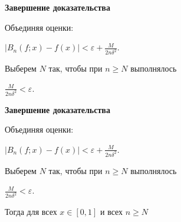 \documentclass[11pt]{article}
\begin{document}
\newpage

\begin{center}
{\color{notaeYELLOW}\bfseries\fontsize{44}{52}\selectfont Завершение доказательства}
\end{center}
\vspace*{\fill}
\begin{center}
\fontsize{36}{43}\selectfont
Объединяя оценки:\par\vspace{0.4in}
$\left| B_n(f;x) - f(x) \right| < \varepsilon + \frac{M}{2n\delta^2}.$\par\vspace{0.4in}
Выберем $N$ так, чтобы при $n \geqslant N$ выполнялось\par\vspace{0.4in}
$\frac{M}{2n\delta^2} < \varepsilon.$\par\vspace{0.4in}
\end{center}
\vspace*{\fill}

\newpage

\begin{center}
{\color{notaeYELLOW}\bfseries\fontsize{44}{52}\selectfont Завершение доказательства}
\end{center}
\vspace*{\fill}
\begin{center}
\fontsize{36}{43}\selectfont
Объединяя оценки:\par\vspace{0.4in}
$\left| B_n(f;x) - f(x) \right| < \varepsilon + \frac{M}{2n\delta^2}.$\par\vspace{0.4in}
Выберем $N$ так, чтобы при $n \geqslant N$ выполнялось\par\vspace{0.4in}
$\frac{M}{2n\delta^2} < \varepsilon.$\par\vspace{0.4in}
Тогда для всех $x \in [0,1]$ и всех $n \geqslant N$\par\vspace{0.4in}
\end{center}
\vspace*{\fill}

\newpage
\end{document}
